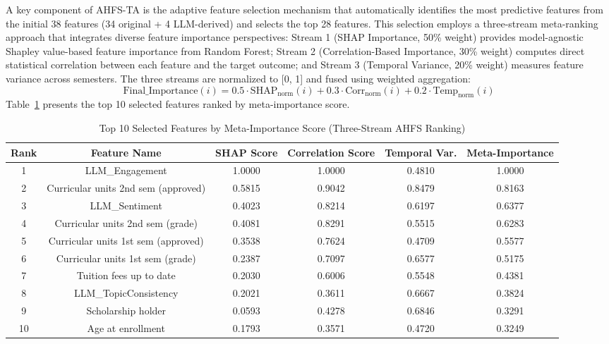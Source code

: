 \documentclass[journal]{IEEEtran}
\begin{document}
A key component of AHFS-TA is the adaptive feature selection mechanism that automatically identifies the most predictive features from the initial 38 features (34 original + 4 LLM-derived) and selects the top 28 features. This selection employs a three-stream meta-ranking approach that integrates diverse feature importance perspectives: Stream 1 (SHAP Importance, 50\% weight) provides model-agnostic Shapley value-based feature importance from Random Forest; Stream 2 (Correlation-Based Importance, 30\% weight) computes direct statistical correlation between each feature and the target outcome; and Stream 3 (Temporal Variance, 20\% weight) measures feature variance across semesters. The three streams are normalized to [0, 1] and fused using weighted aggregation:
\begin{equation}
\text{Final\_Importance}(i) = 0.5 \cdot \text{SHAP}_{\text{norm}}(i) + 0.3 \cdot \text{Corr}_{\text{norm}}(i) + 0.2 \cdot \text{Temp}_{\text{norm}}(i)
\end{equation}
Table~\ref{tab:feature_selection} presents the top 10 selected features ranked by meta-importance score.

\begin{table}[t]
\centering
\caption{Top 10 Selected Features by Meta-Importance Score (Three-Stream AHFS Ranking)}
\label{tab:feature_selection}
\small
\begin{tabular}{cccccc}
\toprule
\textbf{Rank} & \textbf{Feature Name} & \textbf{SHAP Score} & \textbf{Correlation Score} & \textbf{Temporal Var.} & \textbf{Meta-Importance} \\
\midrule
1 & LLM\_Engagement & 1.0000 & 1.0000 & 0.4810 & 1.0000 \\
2 & Curricular units 2nd sem (approved) & 0.5815 & 0.9042 & 0.8479 & 0.8163 \\
3 & LLM\_Sentiment & 0.4023 & 0.8214 & 0.6197 & 0.6377 \\
4 & Curricular units 2nd sem (grade) & 0.4081 & 0.8291 & 0.5515 & 0.6283 \\
5 & Curricular units 1st sem (approved) & 0.3538 & 0.7624 & 0.4709 & 0.5577 \\
6 & Curricular units 1st sem (grade) & 0.2387 & 0.7097 & 0.6577 & 0.5175 \\
7 & Tuition fees up to date & 0.2030 & 0.6006 & 0.5548 & 0.4381 \\
8 & LLM\_TopicConsistency & 0.2021 & 0.3611 & 0.6667 & 0.3824 \\
9 & Scholarship holder & 0.0593 & 0.4278 & 0.6846 & 0.3291 \\
10 & Age at enrollment & 0.1793 & 0.3571 & 0.4720 & 0.3249 \\
\bottomrule
\end{tabular}
\end{table}
\end{document}
